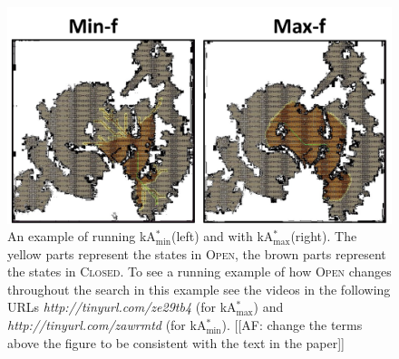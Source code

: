 \documentclass[twoside,11pt]{article}
\newcommand{\astar}{A$^*$\xspace}
\newcommand{\kastar}{kA$^*$\xspace}
\newcommand{\kastarvar}[1]{\textup{kA}$^*_{#1}$\xspace}
\newcommand{\kastarmin}{\kastarvar{\min}}
\newcommand{\kastarmax}{\kastarvar{\max}}
\newcommand{\kxastar}{k$\times$A$^*$\xspace}
\newcommand{\open}{\textsc{Open}\xspace}
\newcommand{\closed}{\textsc{Closed}\xspace}
\begin{document}


\begin{figure}
  \includegraphics[width=\columnwidth]{min-vs-max}
  \caption{An example of running \kastarmin (left) and with \kastarmax (right).
  The yellow parts represent the states in \open, the brown parts represent the states in \closed.
  To see a running example of how \open changes throughout the search in this example see the videos in the following URLs \emph{http://tinyurl.com/ze29tb4} (for \kastarmax) and     \emph{http://tinyurl.com/zawrmtd} (for \kastarmin). [[AF: change the terms above the figure to be consistent with the text in the paper]]}
  \label{fig:min-vs-max}
\end{figure}
\end{document}
